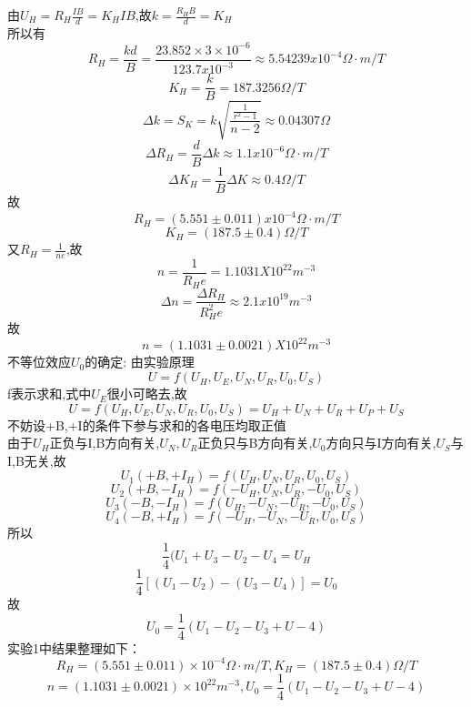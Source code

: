 \documentclass{thuemp}
\begin{document}
由$U_{H}=R_{H}\frac{IB}{d}=K_{H}IB$,故$k=\frac{R_{H}B}{d}=K_{H}$\\所以有
\[R_{H}=\frac{kd}{B}=\frac{23.852\times 3\times 10^{-6}}{123.7x10^{-3}}\approx5.54239x10^{-4} \Omega·m/T\]
\[K_{H}=\frac{k}{B}=187.3256 \Omega/T\]
\[\Delta k =S_{K}=k\sqrt{\frac{\frac{1}{r^{2}-1}}{n-2}}\approx0.04307\Omega\]
\[\Delta R_{H} = \frac{d}{B}\Delta k \approx 1.1x10^{-6} \Omega·m/T\]
\[\Delta K_{H} = \frac{1}{B}\Delta K \approx 0.4\Omega/T\]
故\[R_{H}=(5.551\pm0.011)x10^{-4} \Omega ·m/T\]
\[K_{H}=(187.5\pm 0.4 )\Omega /T\]
又$R_{H}=\frac{1}{ne}$,故\[n=\frac{1}{R_{H}e}=1.1031X10^{22}m^{-3}\]
\[\Delta n =\frac{\Delta R_{H}}{R_{H}^{2}e}\approx2.1x10^{19}m^{-3}\]
故\[n=(1.1031\pm0.0021)X10^{22}m^{-3}\]
不等位效应$U_{0}$的确定:
由实验原理$$U=f(U_{H},U_{E},U_{N},U_{R},U_0,U_{S})$$f表示求和,式中$U_{E}$很小可略去,故
$$U=f(U_{H},U_{E},U_{N},U_{R},U_0,U_{S})=U_{H}+U_{N}+U_{R}+U_{P}+U_{S}$$不妨设+B,+I的条件下参与求和的各电压均取正值
\\由于$U_{H}$正负与I,B方向有关,$U_{N},U_{R}$正负只与B方向有关,$U_0$方向只与I方向有关,$U_{S}$与I,B无关,故
\[U_{1}(+B,+I_{H})=f(U_{H},U_{N},U_{R},U_0,U_{S})\]
\[U_{2}(+B,-I_{H})=f(-U_{H},U_{N},U_{R},-U_0,U_{S})\]
\[U_{3}(-B,-I_{H})=f(U_{H},-U_{N},-U_{R},-U_0,U_{S})\]
\[U_{4}(-B,+I_{H})=f(-U_{H},-U_{N},-U_{R},U_0,U_{S})\]
所以
\[\frac{1}{4}(U_{1}+U_{3}-U_{2}-U_{4}=U_{H}\]
\[\frac{1}{4}[(U_{1}-U_{2})-(U_{3}-U_{4})]=U_0\]
故\[U_0=\frac{1}{4}(U_{1}-U_{2}-U_{3}+U-{4})\]
实验1中结果整理如下：
\[R_{H}=(5.551\pm0.011)\times 10^{-4} \Omega ·m/T,K_{H}=(187.5\pm 0.4 )\Omega /T\]
\[n=(1.1031\pm0.0021)\times 10^{22}m^{-3},U_0=\frac{1}{4}(U_{1}-U_{2}-U_{3}+U-{4})\]
\end{document}

